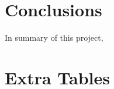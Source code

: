 \documentclass[twocolumn,11pt]{report}
\begin{document}
\chapter{Conclusions}\label{chap:conclusions}
In summary of this project, 









\appendix

\onecolumn
\chapter{Extra Tables}\label{app:Extra_Tables}
%
\end{document}
